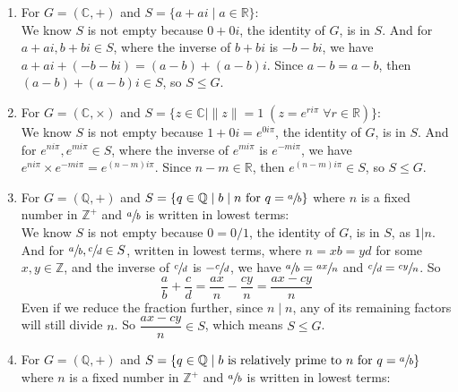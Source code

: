 \documentclass{article}
\newcommand{\Z}{\mathbb{Z}}
\newcommand{\Q}{\mathbb{Q}}
\newcommand{\R}{\mathbb{R}}
\newcommand{\C}{\mathbb{C}}
\begin{document}
    \begin{enumerate}[label=\textbf{\alph*.}]
        \item 
            For $G = (\C, +)$ and $S = \{ a + ai \mid a \in \R \}$: \\
            We know $S$ is not empty because $0 + 0i$,
            the identity of $G$, is in $S$.
            And for $a + ai, b + bi \in S$,
            where the inverse of $b + bi$ is $-b -bi$,
            we have $a + ai + (-b -bi) = (a-b) + (a-b)i$.
            Since $a-b = a-b$,
            then $(a-b) + (a-b)i \in S$,
            so $S \leqslant G$.
        \item 
            For $G = (\C, \times)$ and $S = \{ z \in \C \mid \|z\| = 1
            \; (z = e^{ri\pi} \; \forall r \in \R)\}$: \\
            We know $S$ is not empty because $1 + 0i = e^{0i\pi}$,
            the identity of $G$, is in $S$.
            And for $e^{ni\pi}, e^{mi\pi} \in S$,
            where the inverse of $e^{mi\pi}$ is $e^{-mi\pi}$,
            we have $e^{ni\pi} \times e^{-mi\pi} = e^{(n - m)i\pi}$.
            Since $n - m \in \R$,
            then $e^{(n - m)i\pi} \in S$,
            so $S \leqslant G$.
        \item 
            For $G = (\Q, +)$ and $S = \{ q \in \Q \mid b \mid n 
            \text{ for } q = \sfrac{a}{b} \}$
            where $n$ is a fixed number in $\Z^+$
            and $\sfrac{a}{b}$ is written in lowest terms: \\
            We know $S$ is not empty because $0 = 0/1$,
            the identity of $G$, is in $S$,
            as $1|n$.
            And for $\sfrac{a}{b}, \sfrac{c}{d} \in S$,
            written in lowest terms,
            where $n = xb = yd$ for some $x, y \in \Z$,
            and the inverse of $\sfrac{c}{d}$ is $-\sfrac{c}{d}$,
            we have $\sfrac{a}{b} = \sfrac{ax}{n}$
            and $\sfrac{c}{d} = \sfrac{cy}{n}$. 
            So \[\dfrac{a}{b} + \dfrac{c}{d} = 
            \dfrac{ax}{n} - \dfrac{cy}{n} = \dfrac{ax - cy}{n}\]
            Even if we reduce the fraction further, since $n \mid n$,
            any of its remaining factors will still divide $n$.
            So $\dfrac{ax - cy}{n} \in S$,
            which means $S \leqslant G$.
        \item 
            For $G = (\Q, +)$ and $S = \{ q \in \Q \mid b \text{ is
            relatively prime to $n$ for } q = \sfrac{a}{b} \}$
            where $n$ is a fixed number in $\Z^+$
            and $\sfrac{a}{b}$ is written in lowest terms: \\

\end{enumerate}
\end{document}
